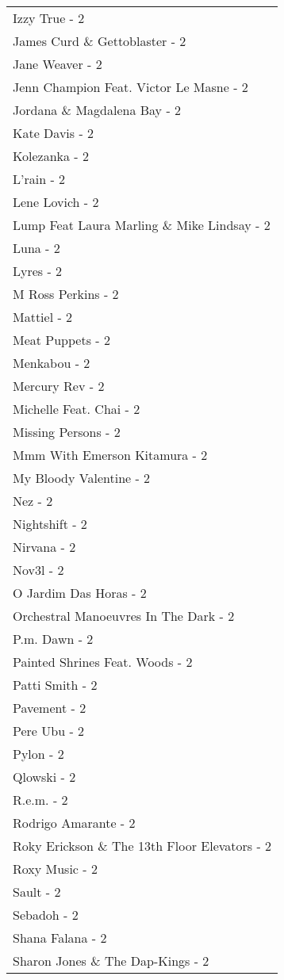 \documentclass[
]{article}
\begin{document}
\begin{longtable}{l}
Izzy True - 2 \\ 
James Curd \& Gettoblaster - 2 \\ 
Jane Weaver - 2 \\ 
Jenn Champion Feat. Victor Le Masne - 2 \\ 
Jordana \& Magdalena Bay - 2 \\ 
Kate Davis - 2 \\ 
Kolezanka - 2 \\ 
L'rain - 2 \\ 
Lene Lovich - 2 \\ 
Lump Feat Laura Marling \& Mike Lindsay - 2 \\ 
Luna - 2 \\ 
Lyres - 2 \\ 
M Ross Perkins - 2 \\ 
Mattiel - 2 \\ 
Meat Puppets - 2 \\ 
Menkabou - 2 \\ 
Mercury Rev - 2 \\ 
Michelle Feat. Chai - 2 \\ 
Missing Persons - 2 \\ 
Mmm With Emerson Kitamura - 2 \\ 
My Bloody Valentine - 2 \\ 
Nez - 2 \\ 
Nightshift - 2 \\ 
Nirvana - 2 \\ 
Nov3l - 2 \\ 
O Jardim Das Horas - 2 \\ 
Orchestral Manoeuvres In The Dark - 2 \\ 
P.m. Dawn - 2 \\ 
Painted Shrines Feat. Woods - 2 \\ 
Patti Smith - 2 \\ 
Pavement - 2 \\ 
Pere Ubu - 2 \\ 
Pylon - 2 \\ 
Qlowski - 2 \\ 
R.e.m. - 2 \\ 
Rodrigo Amarante - 2 \\ 
Roky Erickson \& The 13th Floor Elevators - 2 \\ 
Roxy Music - 2 \\ 
Sault - 2 \\ 
Sebadoh - 2 \\ 
Shana Falana - 2 \\ 
Sharon Jones \& The Dap-Kings - 2 \\ 

\end{longtable}
\end{document}
